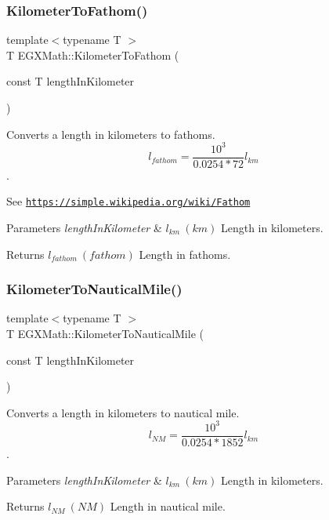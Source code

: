 \subsubsection{\texorpdfstring{Kilometer\+To\+Fathom()}{KilometerToFathom()}}
{\footnotesize\ttfamily template$<$typename T $>$ \\
T E\+G\+X\+Math\+::\+Kilometer\+To\+Fathom (\begin{DoxyParamCaption}\item[{const T}]{length\+In\+Kilometer }\end{DoxyParamCaption})}



Converts a length in kilometers to fathoms. \[ l_{fathom}= \frac{10^{3}}{0.0254 * 72} l_{km} \]. 

See \href{https://simple.wikipedia.org/wiki/Fathom}{\tt https\+://simple.\+wikipedia.\+org/wiki/\+Fathom} 
\begin{DoxyParams}{Parameters}
{\em length\+In\+Kilometer} & $ l_{km}\ (km)$ Length in kilometers. \\
\hline
\end{DoxyParams}
\begin{DoxyReturn}{Returns}
$ l_{fathom}\ (fathom)$ Length in fathoms. 
\end{DoxyReturn}
\mbox{\label{group___e_g_x_math-_conversions-_length_conversions-_kilometer-_nautical_ga4571f464f551ae965f88192b53dd24ff}} 
\subsubsection{\texorpdfstring{Kilometer\+To\+Nautical\+Mile()}{KilometerToNauticalMile()}}
{\footnotesize\ttfamily template$<$typename T $>$ \\
T E\+G\+X\+Math\+::\+Kilometer\+To\+Nautical\+Mile (\begin{DoxyParamCaption}\item[{const T}]{length\+In\+Kilometer }\end{DoxyParamCaption})}



Converts a length in kilometers to nautical mile. \[ l_{NM}= \frac{10^{3}}{0.0254 * 1852} l_{km} \]. 


\begin{DoxyParams}{Parameters}
{\em length\+In\+Kilometer} & $ l_{km}\ (km)$ Length in kilometers. \\
\hline
\end{DoxyParams}
\begin{DoxyReturn}{Returns}
$ l_{NM}\ (NM)$ Length in nautical mile. 
\end{DoxyReturn}
